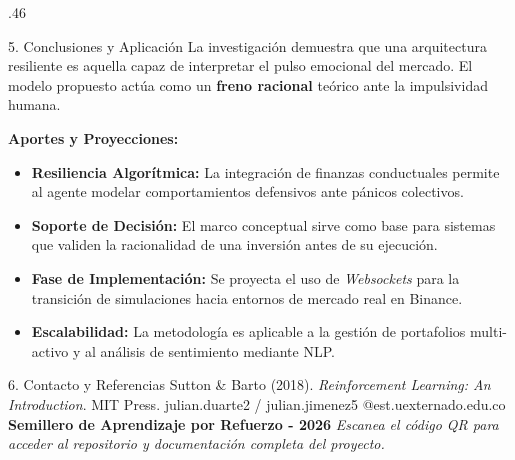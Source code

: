\documentclass[final]{beamer}
\begin{document}
\begin{frame} [fragile]{}
\begin{columns}
\begin{column}{.46\textwidth}
    \vspace{0.5cm}	

    \begin{exampleblock}{5. Conclusiones y Aplicación}
        La investigación demuestra que una arquitectura resiliente es aquella capaz de interpretar el pulso emocional del mercado. El modelo propuesto actúa como un \textbf{freno racional} teórico ante la impulsividad humana.

        \textbf{Aportes y Proyecciones:}
        \begin{itemize}
            \item \textbf{Resiliencia Algorítmica:} La integración de finanzas conductuales permite al agente modelar comportamientos defensivos ante pánicos colectivos.
            \item \textbf{Soporte de Decisión:} El marco conceptual sirve como base para sistemas que validen la racionalidad de una inversión antes de su ejecución.
            \item \textbf{Fase de Implementación:} Se proyecta el uso de \textit{Websockets} para la transición de simulaciones hacia entornos de mercado real en Binance.
            \item \textbf{Escalabilidad:} La metodología es aplicable a la gestión de portafolios multi-activo y al análisis de sentimiento mediante NLP.
        \end{itemize}
    \end{exampleblock}

    \vspace{0.5cm}

    \begin{block}{6. Contacto y Referencias}
        \small
        Sutton \& Barto (2018). \textit{Reinforcement Learning: An Introduction}. MIT Press.
        \smallskip
        \centering
        \faEnvelope \quad julian.duarte2 / julian.jimenez5 @est.uexternado.edu.co \\
        \textbf{Semillero de Aprendizaje por Refuerzo - 2026}
        \vfill
        \centering
        \small \textit{Escanea el código QR para acceder al repositorio y documentación completa del proyecto.}
    \end{block}

    \end{column}
\end{columns}

\end{frame}
\end{document}
